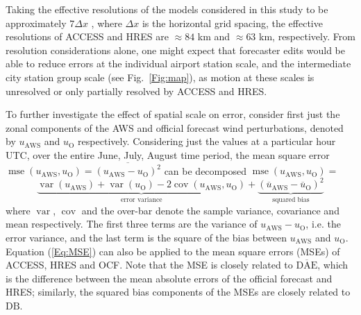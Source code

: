 \documentclass{ametsoc}
\DeclareMathOperator{\mse}{mse}
\DeclareMathOperator{\cov}{cov}
\DeclareMathOperator{\var}{var}
\begin{document}
Taking the effective resolutions of the models considered in this study to be approximately $7\Delta x$ \citep[e.g.][]{skamarock04, abdalla13}, where $\Delta x$ is the horizontal grid spacing, the effective resolutions of ACCESS and HRES are $\approx 84$ km and $\approx 63$ km, respectively. From resolution considerations alone, one might expect that forecaster edits would be able to reduce errors at the individual airport station scale, and the intermediate city station group scale (see Fig.~\ref{Fig:map}), as motion at these scales is unresolved or only partially resolved by ACCESS and HRES.

To further investigate the effect of spatial scale on error, consider first just the zonal components of the AWS and official forecast wind perturbations, denoted by $u_\text{AWS}$ and $u_\text{O}$ respectively. Considering just the values at a particular hour UTC, over the entire June, July, August time period, the mean square error $\mse\left(u_\text{AWS}, u_\text{O}\right) = \overline{\left(u_\text{AWS} - u_\text{O}\right)^2}$ can be decomposed $\mse\left(u_\text{AWS}, u_\text{O}\right)=$ 
\begin{equation}
\underbrace{\var\left(u_\text{AWS}\right) + \var\left(u_\text{O}\right) - 2\cov\left(u_\text{AWS}, u_\text{O}\right)}_\text{error variance} + \underbrace{\left(\overline{u}_\text{AWS} - \overline{u}_\text{O}\right)^2}_{\text{squared bias}} \label{Eq:MSE}
\end{equation}
where $\var$, $\cov$ and the over-bar denote the sample variance, covariance and mean respectively. The first three terms are the variance of $u_\text{AWS} - u_\text{O}$, i.e. the error variance, and the last term is the square of the bias between $u_\text{AWS}$ and $u_\text{O}$. Equation (\ref{Eq:MSE}) can also be applied to the mean square errors (MSEs) of ACCESS, HRES and OCF. Note that the MSE is closely related to $\overline{\text{DAE}}$, which is the difference between the mean absolute errors of the official forecast and HRES; similarly, the squared bias components of the MSEs are closely related to $\text{DB}$. 
\end{document}
